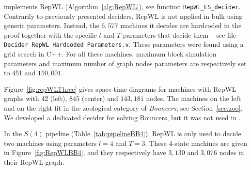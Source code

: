 



\CoqBB implements RepWL (Algorithm~\ref{alg:RepWL}), see function \texttt{RepWL\_ES\_decider}. Contrarily to previously presented deciders, RepWL is not applied in bulk using generic parameters. Instead, the ${6,577}$ machines it decides are hardcoded in the proof together with the specific $l$ and $T$ parameters that decide them -- see file \texttt{Decider\_RepWL\_Hardcoded\_Parameters.v}. These parameters were found using a grid search in C++. For all these machines, maximum block simulation parameters and maximum number of graph nodes parameters are respectively set to 451 and ${150,001}$.


Figure~\ref{fig:repWLThree} gives space-time diagrams for machines with RepWL graphs with 42 (left), ${845}$ (center) and $143{,}181$ nodes. The machines on the left and on the right fit in the zoological category of \textit{Bouncers}, see Section~\ref{sec:zoo}. We developed a dedicated decider for solving Bouncers, but it was not used in \CoqBB \cite{bbchallenge_part1}.

In the $S(4)$ pipeline (Table~\ref{tab:pipelineBB4}), RepWL is only used to decide two machines using parameters $l=4$ and $T=3$. These 4-state machines are given in Figure~\ref{fig:RepWLBB4}, and they respectively have $3{,}130$ and $3{,}076$ nodes in their RepWL graph.

